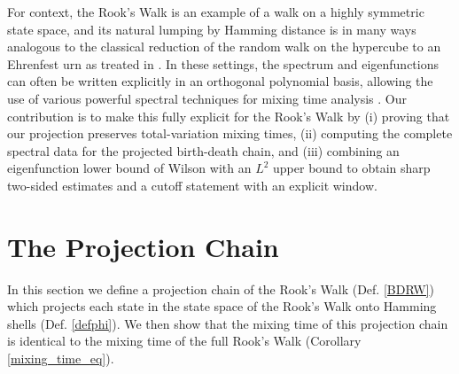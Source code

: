\documentclass{article}
\theoremstyle{definition}
\theoremstyle{definition}
\theoremstyle{definition}
\theoremstyle{definition}
\theoremstyle{named}
\begin{document}
\noindent For context, the Rook's Walk is an example of a walk on a highly symmetric state space, and its natural lumping by Hamming distance is in many ways analogous to the classical reduction of the random walk on the hypercube to an Ehrenfest urn as treated in \cite{levin_markov_2017}. In these settings, the spectrum and eigenfunctions can often be written explicitly in an orthogonal polynomial basis, allowing the use of various powerful spectral techniques for mixing time analysis  \cite{saloff-coste_random_2004,levin_markov_2017}. Our contribution is to make this fully explicit for the Rook's Walk by (i) proving that our projection preserves total-variation mixing times, (ii) computing the complete spectral data for the projected birth-death chain, and (iii) combining an eigenfunction lower bound of Wilson with an $L^2$ upper bound to obtain sharp two-sided estimates and a cutoff statement with an explicit window.



\section{The Projection Chain}
In this section we define a projection chain of the Rook's Walk (Def. \ref{BDRW}) which projects each state in the state space of the Rook's Walk onto Hamming shells (Def. \ref{defphi}). We then show that the mixing time of this projection chain is identical to the mixing time of the full Rook's Walk (Corollary \ref{mixing_time_eq}).
\end{document}
